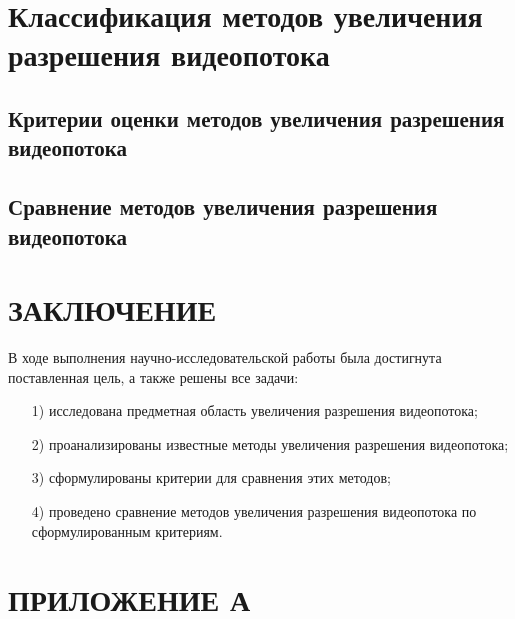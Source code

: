 \documentclass{bmstu}
\begin{document}
\chapter{Классификация методов увеличения разрешения видеопотока}

\section{Критерии оценки методов увеличения разрешения видеопотока}

\section{Сравнение методов увеличения разрешения видеопотока}

{\centering \chapter*{ЗАКЛЮЧЕНИЕ}}

В ходе выполнения научно-исследовательской работы была достигнута поставленная цель, а также решены все задачи:
\begin{enumerate}
\item[1)] исследована предметная область увеличения разрешения видеопотока;
\item[2)] проанализированы известные методы увеличения разрешения видеопотока;
\item[3)] сформулированы критерии для сравнения этих методов;
\item[4)] проведено сравнение методов увеличения разрешения видеопотока по сформулированным критериям.
\end{enumerate}

{\centering {\center\printbibliography[title=СПИСОК ИСПОЛЬЗОВАННЫХ ИСТОЧНИКОВ]}}

{\centering \chapter*{ПРИЛОЖЕНИЕ А}}
\end{document}
